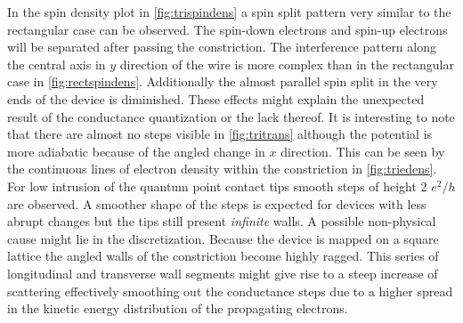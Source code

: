 In the spin density plot in \cref{fig:trispindens} a spin split pattern very similar to the rectangular case can be observed. The spin-down electrons and spin-up electrons will be separated after passing the constriction. The interference pattern along the central axis in $y$ direction of the wire is more complex than in the rectangular case in \cref{fig:rectspindens}. Additionally the almost parallel spin split in the very ends of the device is diminished. These effects might explain the unexpected result of the conductance quantization or the lack thereof.
It is interesting to note that there are almost no steps visible in \cref{fig:tritrans} although the potential is more adiabatic because of the angled change in $x$ direction. This can be seen by the continuous lines of electron density within the constriction in \cref{fig:triedens}. For low intrusion of the quantum point contact tips smooth steps of height 2 $e^2/h$ are observed. A smoother shape of the steps is expected for devices with less abrupt changes but the tips still present \emph{infinite} walls. A possible non-physical cause might lie in the discretization. Because the device is mapped on a square lattice the angled walls of the constriction become highly ragged. This series of longitudinal and transverse wall segments might give rise to a steep increase of scattering effectively smoothing out the conductance steps due to a higher spread in the kinetic energy distribution of the propagating electrons.
\FloatBarrier
